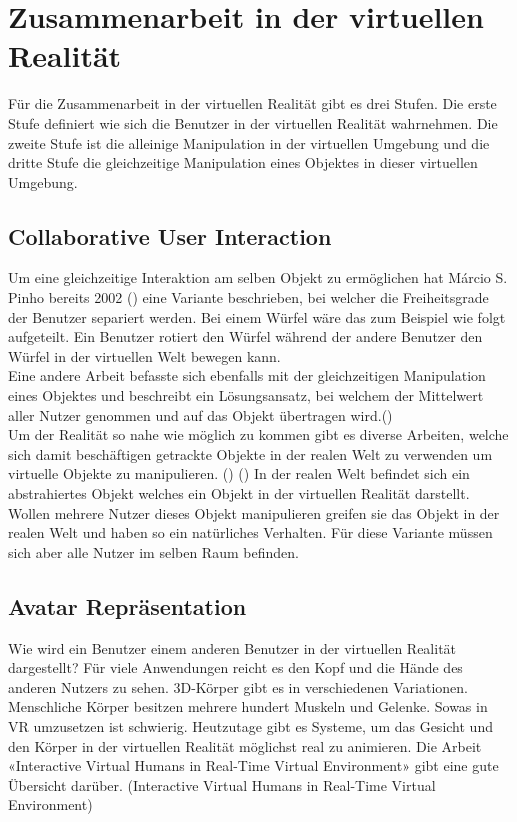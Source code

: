 \section{Zusammenarbeit in der virtuellen Realität}
Für die Zusammenarbeit in der virtuellen Realität gibt es drei Stufen. Die erste Stufe definiert wie sich die Benutzer in der virtuellen Realität wahrnehmen. Die zweite Stufe ist die alleinige Manipulation in der virtuellen Umgebung und die dritte Stufe die gleichzeitige Manipulation eines Objektes in dieser virtuellen Umgebung. 


\subsection{Collaborative User Interaction}
\label{ch:collaborative_user_interaction}
Um eine gleichzeitige Interaktion am selben Objekt zu ermöglichen hat Márcio S. Pinho bereits 2002 (\cite{pinho_cooperative_2002}) eine Variante beschrieben, bei welcher die Freiheitsgrade der Benutzer separiert werden. Bei einem Würfel wäre das zum Beispiel wie folgt aufgeteilt. Ein Benutzer rotiert den Würfel während der andere Benutzer den Würfel in der virtuellen Welt bewegen kann. \\
 
\noindent Eine andere Arbeit befasste sich ebenfalls mit der gleichzeitigen Manipulation eines Objektes und beschreibt ein Lösungsansatz, bei welchem der Mittelwert aller Nutzer genommen und auf das Objekt übertragen wird.(\cite{ruddle_symmetric_2002}) \\
 
\noindent Um der Realität so nahe wie möglich zu kommen gibt es diverse Arbeiten, welche sich damit beschäftigen getrackte Objekte in der realen Welt zu verwenden um virtuelle Objekte zu manipulieren. (\cite{he_physhare:_2017}) (\cite{podkosova_immersivedeck:_2016}) In der realen Welt befindet sich ein abstrahiertes Objekt welches ein Objekt in der virtuellen Realität darstellt. Wollen mehrere Nutzer dieses Objekt manipulieren greifen sie das Objekt in der realen Welt und haben so ein natürliches Verhalten. Für diese Variante müssen sich aber alle Nutzer im selben Raum befinden.
 
\subsection{Avatar Repräsentation}
\label{ch:avatar_repraesentation}
Wie wird ein Benutzer einem anderen Benutzer in der virtuellen Realität dargestellt? 
Für viele Anwendungen reicht es den Kopf und die Hände des anderen Nutzers zu sehen.
3D-Körper gibt es in verschiedenen Variationen. Menschliche Körper besitzen mehrere hundert Muskeln und Gelenke. Sowas in VR umzusetzen ist schwierig.
Heutzutage gibt es Systeme, um das Gesicht und den Körper in der virtuellen Realität möglichst real zu animieren. Die Arbeit «Interactive Virtual Humans in Real-Time Virtual Environment» gibt eine gute Übersicht darüber. (Interactive Virtual Humans in Real-Time Virtual Environment)


